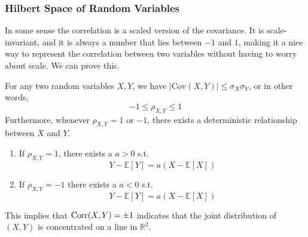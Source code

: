   \subsubsection{Hilbert Space of Random Variables}

    In some sense the correlation is a scaled version of the covariance. It is scale-invariant, and it is always a number that lies between $-1$ and $1$, making it a nice way to represent the correlation between two variables without having to worry about scale. We can prove this. 

    \begin{theorem}
      For any two random variables $X, Y$, we have $|\mathrm{Cov}(X, Y)| \leq \sigma_X \sigma_Y$, or in other words, 
      \begin{equation}
        -1 \leq \rho_{X, Y} \leq 1
      \end{equation}
      Furthermore, whenever $\rho_{X, Y} = 1$ or $-1$, there exists a deterministic relationship between $X$ and $Y$. 
      \begin{enumerate}
        \item If $\rho_{X, Y} = 1$, there exists a $a > 0$ s.t. 
        \begin{equation}
          Y - \mathbb{E}[Y] = a (X - \mathbb{E}[X])
        \end{equation}
        \item If $\rho_{X, Y} = -1$ there exists a $a < 0$ s.t. 
        \begin{equation}
          Y - \mathbb{E}[Y] = a (X - \mathbb{E}[X])
        \end{equation}
      \end{enumerate}
      This implies that $\Corr(X, Y) = \pm 1$ indicates that the joint distribution of $(X, Y)$ is concentrated on a line in $\mathbb{R}^2$. 
    \end{theorem}

